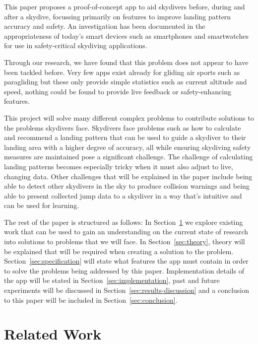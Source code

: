 \documentclass[11pt, a4paper, twocolumn]{article}
\begin{document}
This paper proposes a proof-of-concept app to aid skydivers before, during and after a skydive, focussing primarily on features to improve landing pattern accuracy and safety.
An investigation has been documented in the appropriateness of today's smart devices such as smartphones and smartwatches for use in safety-critical skydiving applications.

Through our research, we have found that this problem does not appear to have been tackled before. Very few apps exist already for gliding air sports such as paragliding but these only provide simple statistics such as current altitude and speed, nothing could be found to provide live feedback or safety-enhancing features.

This project will solve many different complex problems to contribute solutions to the problems skydivers face. Skydivers face problems such as how to calculate and recommend a landing pattern that can be used to guide a skydiver to their landing area with a higher degree of accuracy, all while ensuring skydiving safety measures are maintained pose a significant challenge. The challenge of calculating landing patterns becomes especially tricky when it must also adjust to live, changing data. Other challenges that will be explained in the paper include being able to detect other skydivers in the sky to produce collision warnings and being able to present collected jump data to a skydiver in a way that's intuitive and can be used for learning.

The rest of the paper is structured as follows: In Section~\ref{sec:related-work} we explore existing work that can be used to gain an understanding on the current state of research into solutions to problems that we will face. In Section~\ref{sec:theory}, theory will be explained that will be required when creating a solution to the problem. Section~\ref{sec:specification} will state what features the app must contain in order to solve the problems being addressed by this paper. Implementation details of the app will be stated in Section~\ref{sec:implementation}, past and future experiments will be discussed in Section~\ref{sec:results-discussion} and a conclusion to this paper will be included in Section~\ref{sec:conclusion}.


\section{Related Work}\label{sec:related-work}
\end{document}
